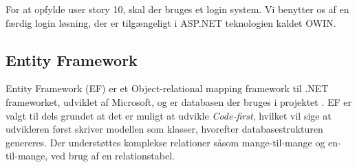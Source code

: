 For at opfylde user story 10, skal der bruges et login system.
Vi benytter os af en færdig login løsning, der er tilgængeligt i ASP.NET teknologien kaldet OWIN.


\subsection{Entity Framework}
Entity Framework (EF) er et Object-relational mapping framework til .NET frameworket, udviklet af Microsoft, og er databasen der bruges i projektet \citep{EF}.
EF er valgt til dels grundet at det er muligt at udvikle \textit{Code-first}, hvilket vil sige at udvikleren først skriver modellen som klasser, hvorefter databasestrukturen genereres.
Der understøttes komplekse relationer såsom mange-til-mange og en-til-mange, ved brug af en relationstabel.
